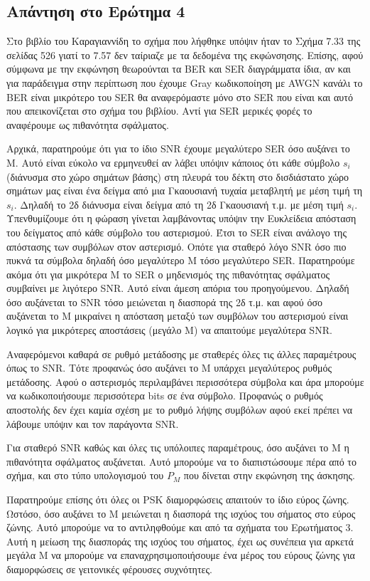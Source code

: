\documentclass{article}
\begin{document}
\subsection*{Απάντηση στο Ερώτημα 4}
Στο βιβλίο του Καραγιαννίδη το σχήμα που λήφθηκε υπόψιν ήταν το Σχήμα 7.33 της σελίδας 526 γιατί το 7.57 δεν ταίριαζε με τα δεδομένα της εκφώνσησης. Επίσης, αφού σύμφωνα με την εκφώνηση θεωρούνται τα BER και SER διαγράμματα ίδια, αν και για παράδειγμα στην περίπτωση που έχουμε Gray κωδικοποίηση με AWGN κανάλι το BER είναι μικρότερο του SER θα αναφερόμαστε μόνο στο SER που είναι και αυτό που απεικονίζεται στο σχήμα του βιβλίου. Αντί για SER μερικές φορές το αναφέρουμε ως πιθανότητα σφάλματος.
\par
Αρχικά, παρατηρούμε ότι για το ίδιο SNR έχουμε μεγαλύτερο SER όσο αυξάνει το M. Αυτό είναι εύκολο να ερμηνευθεί αν λάβει υπόψιν κάποιος ότι κάθε σύμβολο $s_i$ (διάνυσμα στο χώρο σημάτων βάσης) στη πλευρά του δέκτη στο δισδιάστατο χώρο σημάτων μας είναι ένα δείγμα από μια Γκαουσιανή τυχαία μεταβλητή με μέση τιμή τη $s_i$. Δηλαδή το 2δ διάνυσμα είναι δείγμα από τη 2δ Γκαουσιανή τ.μ. με μέση τιμή $s_i$. Υπενθυμίζουμε ότι η φώραση γίνεται λαμβάνοντας υπόψιν την Ευκλείδεια απόσταση του δείγματος από κάθε σύμβολο του αστερισμού. Έτσι το SER είναι ανάλογο της απόστασης των συμβόλων στον αστερισμό. Οπότε για σταθερό λόγο SNR όσο πιο πυκνά τα σύμβολα δηλαδή όσο μεγαλύτερο Μ τόσο μεγαλύτερο SER. Παρατηρούμε ακόμα ότι για μικρότερα Μ το SER ο μηδενισμός της πιθανότητας σφάλματος συμβαίνει με λιγότερο SNR. Αυτό είναι άμεση απόρια του προηγούμενου. Δηλαδή όσο αυξάνεται το SNR τόσο μειώνεται η διασπορά της 2δ τ.μ. και αφού όσο αυξάνεται το M μικραίνει η απόσταση μεταξύ των συμβόλων του αστερισμού είναι λογικό για μικρότερες αποστάσεις (μεγάλο Μ) να απαιτούμε μεγαλύτερα SNR.
\par
Αναφερόμενοι καθαρά σε ρυθμό μετάδοσης με σταθερές όλες τις άλλες παραμέτρους όπως το SNR. Τότε προφανώς όσο αυξάνει το M υπάρχει μεγαλύτερος ρυθμός μετάδοσης. Αφού ο αστερισμός περιλαμβάνει περισσότερα σύμβολα και άρα μπορούμε να κωδικοποιήσουμε περισσότερα bits σε ένα σύμβολο. Προφανώς ο ρυθμός αποστολής δεν έχει καμία σχέση με το ρυθμό λήψης συμβόλων αφού εκεί πρέπει να λάβουμε υπόψιν και τον παράγοντα SNR. 
\par
Για σταθερό SNR καθώς και όλες τις υπόλοιπες παραμέτρους, όσο αυξάνει το M η πιθανότητα σφάλματος αυξάνεται. Αυτό μπορούμε να το διαπιστώσουμε πέρα από το σχήμα, και στο τύπο υπολογισμού του $P_Μ$ που δίνεται στην εκφώνηση της άσκησης.
\par
Παρατηρούμε επίσης ότι όλες οι PSK διαμορφώσεις απαιτούν το ίδιο εύρος ζώνης. Ωστόσο, όσο αυξάνει το M μειώνεται η διασπορά της ισχύος του σήματος στο εύρος ζώνης. Αυτό μπορούμε να το αντιληφθούμε και από τα σχήματα του Ερωτήματος 3. Αυτή η μείωση της διασποράς της ισχύος του σήματος, έχει ως συνέπεια για αρκετά μεγάλα Μ να μπορούμε να επαναχρησιμοποιήσουμε ένα μέρος του εύρους ζώνης για διαμορφώσεις σε γειτονικές φέρουσες συχνότητες.
\end{document}
